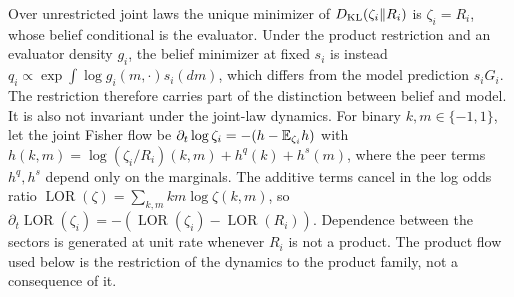 Over unrestricted joint laws the unique minimizer of $D_{\mathrm{KL}}(\zeta_i\Vert R_i)$ is $\zeta_i=R_i$, whose belief conditional is the evaluator. Under the product restriction and an evaluator density $g_i$, the belief minimizer at fixed $s_i$ is instead $q_i\propto\exp\int\log g_i(m,\cdot)s_i(dm)$, which differs from the model prediction $s_iG_i$. The restriction therefore carries part of the distinction between belief and model. It is also not invariant under the joint-law dynamics. For binary $k,m\in\{-1,1\}$, let the joint Fisher flow be $\partial_t\log\zeta_i=-(h-\mathbb E_{\zeta_i}h)$ with $h(k,m)=\log(\zeta_i/R_i)(k,m)+h^q(k)+h^s(m)$, where the peer terms $h^q,h^s$ depend only on the marginals. The additive terms cancel in the log odds ratio $\operatorname{LOR}(\zeta)=\sum_{k,m}km\log\zeta(k,m)$, so $\partial_t\operatorname{LOR}(\zeta_i)=-(\operatorname{LOR}(\zeta_i)-\operatorname{LOR}(R_i))$. Dependence between the sectors is generated at unit rate whenever $R_i$ is not a product. The product flow used below is the restriction of the dynamics to the product family, not a consequence of it.

